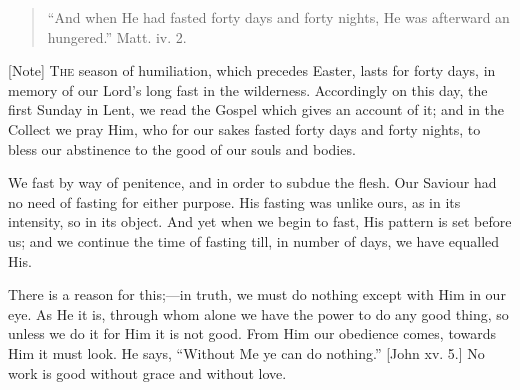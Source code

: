 
\begin{quote}

``And when He had fasted forty days and forty nights, He was
afterward an hungered.'' Matt. iv. 2.

\end{quote}

[Note] T\textsc{he} season of
humiliation, which precedes Easter, lasts for forty days, in memory of
our Lord's long fast in the wilderness. Accordingly on this day, the
first Sunday in Lent, we read the Gospel which gives an account of it;
and in the Collect we pray Him, who for our sakes fasted forty days
and forty nights, to bless our abstinence to the good of our souls and
bodies.

We fast by way of penitence, and in order to subdue the flesh. Our
Saviour had no need of fasting for either purpose. His fasting was
unlike ours, as in its intensity, so in its object. And yet when we
begin to fast, His pattern is set before us; and we continue the time
of fasting till, in number of days, we have equalled His.

There is a reason for this;—in truth, we must do nothing except
with Him in our eye. As He it is, through whom alone we have the power
to do any good thing, so unless we do it for Him it is not good. From
Him our obedience comes, towards Him it must look. He says,
``Without Me ye can do nothing.'' [John xv. 5.] No work is
good without grace and without love.

